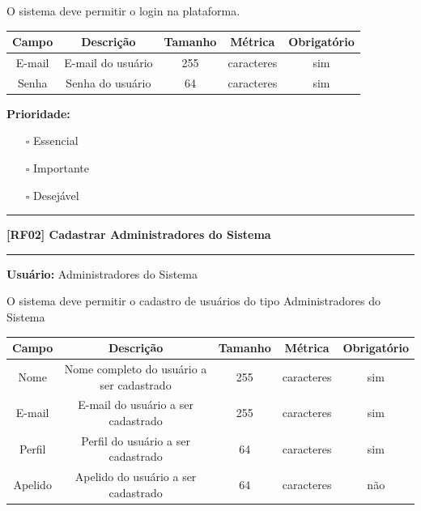 	O sistema deve permitir o login na plataforma.
	
	\begin{center}
		\begin{adjustbox}{width=\textwidth}      \begin{tabular}{ |c|c|c|c|c| } 
			\hline
			\rowcolor{lightgray} Campo & Descrição & Tamanho & Métrica & Obrigatório \\
			\hline
			E-mail & E-mail do usuário  & 255 & caracteres & sim \\ 
			\hline
			Senha & Senha do usuário & 64 & caracteres & sim \\
			\hline
		\end{tabular}    \end{adjustbox}
	\end{center}
	
	\textbf{Prioridade: }\begin{itemize}
		\item[\hspace{1cm}\rlap{\raisebox{0.2ex}{\hspace{0.4ex}\scriptsize \ding{56}}}$\square$]
		Essencial
		\item[\hspace{1cm}$\square$]
		Importante
		\item[\hspace{1cm}$\square$]
		Desejável
	\end{itemize}
	\begin{center}
		\noindent\rule{\textwidth}{0.4pt}
		\textbf{[RF02] Cadastrar Administradores do Sistema}
		\noindent\rule{\textwidth}{0.4pt}
	\end{center}
	\textbf{Usuário:} Administradores do Sistema
	
	O sistema deve permitir o cadastro de usuários do tipo Administradores do Sistema
	
	\begin{center}
		\begin{adjustbox}{width=\textwidth}      \begin{tabular}{ |c|c|c|c|c| } 
			\hline
			\rowcolor{lightgray} Campo & Descrição & Tamanho & Métrica & Obrigatório \\
			\hline
			Nome & Nome completo do usuário a ser cadastrado & 255 & caracteres & sim \\ 
			\hline
			E-mail & E-mail do usuário a ser cadastrado & 255 & caracteres & sim \\ 
			\hline
			Perfil & Perfil do usuário a ser cadastrado & 64 & caracteres & sim \\ 
			\hline
			Apelido & Apelido do usuário a ser cadastrado & 64 & caracteres & não \\
			\hline
		\end{tabular}    \end{adjustbox}
	\end{center}
	

